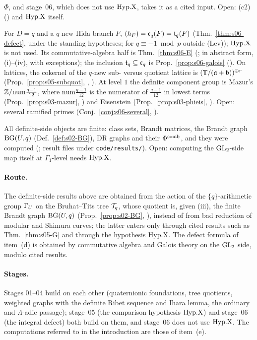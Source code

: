 \begin{description}[leftmargin=0pt,itemsep=3pt]
  $\Phi$, and stage~06, which does not use $\mathrm{Hyp.X}$, takes it as a cited input. Open: (c2) (\stopen)
  and $\mathrm{Hyp.X}$ itself.
\item[(d) Congruence modules.] For $D=q$ and a $q$-new Hida branch $F$, $(h_F)=\mathfrak{c}_q(F)=\mathfrak{t}_q(F)$
  (Thm.~\ref{thm:s06-defect}, \stpmc{} under the standing hypotheses; \stopen{} for $q\equiv-1\bmod p$ outside (Lev));
  $\mathrm{Hyp.X}$ is not used. Its commutative-algebra half is Thm.~\ref{thm:s06-E} (\stproved; \stformalized{} in abstract form,
  (i)--(iv), with exceptions); the inclusion $\mathfrak{t}_q\subseteq\mathfrak{c}_q$ is Prop.~\ref{prop:s06-galois} (\stpmc). On lattices, the
  cokernel of the $q$-new sub- versus quotient lattice is $(\mathbb{T}/(\mathfrak{a}+\mathfrak{b}))^{\oplus r}$ (Prop.~\ref{prop:s05-subquot},
  \stproved, \stformal). At level $1$ the definite component group is Mazur's
  $\mathbb{Z}/\mathrm{num}\frac{q-1}{12}$, where $\mathrm{num}\frac{q-1}{12}$ is the numerator of $\frac{q-1}{12}$ in lowest terms (Prop.~\ref{prop:s03-mazur}, \stpmc) and
  Eisenstein (Prop.~\ref{prop:s03-phieis}, \stproved). Open: several ramified primes (Conj.~\ref{conj:s06-several},
  \stconj).
\item[(e) Computability.] All definite-side objects are finite: class sets, Brandt matrices, the Brandt graph $\mathrm{BG}(U,q)$
  (Def.~\ref{def:s02-BG}), DR graphs and their $\Phi^{\mathrm{comb}}$, and they were computed (\stcomp; result files under
  \texttt{code/results/}). Open: computing the $\mathrm{GL}_2$-side map itself at $\Gamma_1$-level needs $\mathrm{Hyp.X}$.
\end{description}

\paragraph{Route.}\label{ss:s00-route} The definite-side results above are obtained from the action of the
$\{q\}$-arithmetic group $\Gamma_U$ on the Bruhat--Tits tree $\mathcal{T}_q$, whose quotient is, given (iii), the finite Brandt graph
$\mathrm{BG}(U,q)$ (Prop.~\ref{prop:s02-BG}, \stproved), instead of from bad reduction of modular and Shimura curves; the latter
enters only through cited results such as Thm.~\ref{thm:s05-G} and through the hypothesis $\mathrm{Hyp.X}$. The defect formula of
item~(d) is obtained by commutative algebra and Galois theory on the $\mathrm{GL}_2$ side, modulo cited results.

\paragraph{Stages.}\label{ss:s00-outline} Stages 01--04 build on each other (quaternionic foundations, tree quotients,
weighted graphs with the definite Ribet sequence and Ihara lemma, the ordinary and $\Lambda$-adic passage); stage~05 (the
comparison hypothesis $\mathrm{Hyp.X}$) and stage~06 (the integral defect) both build on them, and stage~06 does not use $\mathrm{Hyp.X}$. The
computations referred to in the introduction are those of item~(e).
